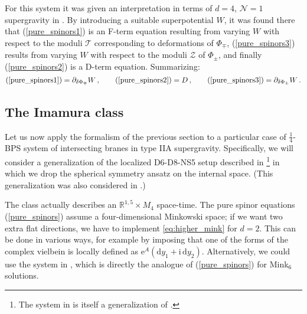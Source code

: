 \documentclass[12pt]{article}
\newcommand{\R}{\mathbb{R}}
\newcommand{\dd}{\mathrm{d}}
\newcommand{\e}{\mathrm{e}}
\newcommand{\ii}{\mathrm{i}}
\begin{document}
For this system it was given an interpretation in terms of $d=4$, ${\mathcal N}=1$ supergravity in \cite{koerber-martucci-ten-four}. By introducing a suitable superpotential $W$, it was found there that (\ref{pure_spinors1}) is an F-term equation resulting from varying $W$ with respect to the moduli ${\mathcal T}$ corresponding to deformations of $\Phi_\mp$, (\ref{pure_spinors3}) results from varying $W$ with respect to the moduli ${\mathcal Z}$ of $\Phi_\pm$, and finally (\ref{pure_spinors2})  is a D-term equation. Summarizing:
\begin{equation}\label{eq:DW}
	(\ref{pure_spinors1})= \partial_{\delta \Phi_\mp} W \, ,\qquad (\ref{pure_spinors2}) = D \, ,\qquad (\ref{pure_spinors3}) = \partial_{\delta \Phi_\pm} W \, .
\end{equation}




\subsection{The Imamura class} \label{sub:imamura}

Let us now apply the formalism of the previous section to a particular case of $\frac{1}{4}$-BPS system of intersecting branes in type IIA supergravity. Specifically, we will consider a generalization of the localized D6-D8-NS5 setup described in \cite{imamura}\footnote{The system in \cite{imamura} is itself a generalization of \cite[Sec.~3]{janssen-meessen-ortin}.} in which we drop the spherical symmetry ansatz on the internal space. (This generalization was also considered in \cite{blaback-janssen-vanriet-vercnocke}.)

The class actually describes an $\R^{1,5} \times M_4$ space-time. The pure spinor equations (\ref{pure_spinors}) assume a four-dimensional Minkowski space; if we want two extra flat directions, we have to implement \eqref{eq:higher_mink} for $d=2$. This can be done in various ways, for example by imposing that one of the forms of the complex vielbein is locally defined as 
$\e^A (\dd y_1 + \ii \, \dd y_2)$.
Alternatively, we could use the system in \cite{lust-patalong-tsimpis}, which is directly the analogue of (\ref{pure_spinors}) for Mink$_6$ solutions.
\end{document}
